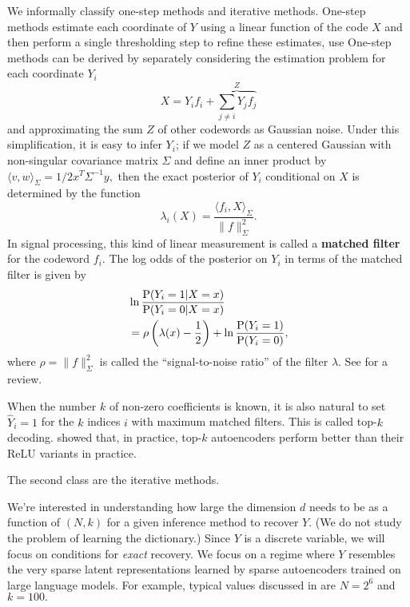 We informally classify one-step methods and iterative methods. One-step methods estimate each coordinate of $Y$ using a linear function of the code $X$ and then perform a single thresholding step to refine these estimates, use One-step methods can be derived by separately considering the estimation problem for each coordinate $Y_i$
\begin{equation}
	X = Y_i f_i + \overbrace{\sum_{j \neq i} Y_j f_j}^Z \label{eq:simple-model}
\end{equation}
and approximating the sum $Z$ of other codewords as Gaussian noise. Under this simplification, it is easy to infer $Y_i$; if we model $Z$ as a centered Gaussian with non-singular covariance matrix $\Sigma$ and define an inner product by $\langle v, w \rangle_\Sigma = 1/2 x^T \Sigma^{-1} y,$ then the exact posterior of $Y_i$ conditional on $X$ is determined by the function
$$
	\lambda_i(X) = \frac{\langle f_i, X \rangle_\Sigma}{\lVert f \rVert_\Sigma^2}.
$$
In signal processing, this kind of linear measurement is called a \textbf{matched filter} for the codeword $f_i$. The log odds of the posterior on $Y_i$ in terms of the matched filter is given by
\begin{align} \label{eq:log_odds}
	 & \ln \frac{\operatorname{P}(Y_i = 1|X = x)}{\operatorname{P}(Y_i = 0|X = x)} \nonumber                         \\
	 & = \rho \left(\lambda(x) - \frac 1 2\right) + \ln \frac{\operatorname{P}(Y_i = 1)}{\operatorname{P}(Y_i = 0)},
\end{align}
where $\rho = \lVert f \rVert_\Sigma^2$ is called the ``signal-to-noise ratio'' of the filter $\lambda.$ See  for a review.

When the number $k$ of non-zero coefficients is known, it is also natural to set $\hat{Y}_i = 1$ for the $k$ indices $i$ with maximum matched filters. This is called top-$k$ decoding. \cite{gao_scaling_2024} showed that, in practice, top-$k$ autoencoders perform better than their ReLU variants in practice.

The second class are the iterative methods.

We're interested in understanding how large the dimension $d$ needs to be as a function of $(N, k)$ for a given inference method to recover $Y.$ (We do not study the problem of learning the dictionary.) Since $Y$ is a discrete variable, we will focus on conditions for \textit{exact} recovery. We focus on a regime where $Y$ resembles the very sparse latent representations learned by sparse autoencoders trained on large language models. For example, typical values discussed in \cite{gao_scaling_2024} are $N = 2^{6}$ and $k = 100.$

